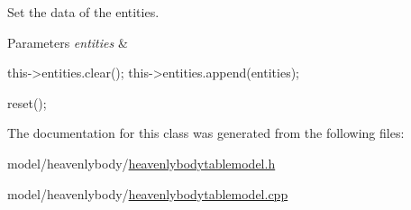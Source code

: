 \-Set the data of the entities. 


\begin{DoxyParams}{\-Parameters}
{\em entities} & \\
\hline
\end{DoxyParams}

\begin{DoxyCode}
{
    this->entities.clear();
    this->entities.append(entities);

    reset();
}
\end{DoxyCode}


\-The documentation for this class was generated from the following files\-:\begin{DoxyCompactItemize}
\item 
model/heavenlybody/\hyperlink{heavenlybodytablemodel_8h}{heavenlybodytablemodel.\-h}\item 
model/heavenlybody/\hyperlink{heavenlybodytablemodel_8cpp}{heavenlybodytablemodel.\-cpp}\end{DoxyCompactItemize}
